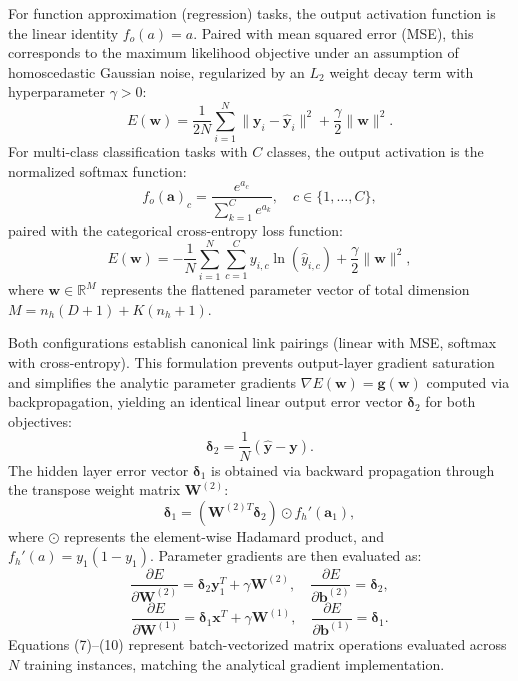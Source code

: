 \documentclass[10pt, conference]{IEEEtran}
\begin{document}
For function approximation (regression) tasks, the output activation function is the linear identity $f_o(a) = a$. Paired with mean squared error (MSE), this corresponds to the maximum likelihood objective under an assumption of homoscedastic Gaussian noise, regularized by an $L_2$ weight decay term with hyperparameter $\gamma > 0$:
\begin{equation}
E(\mathbf{w}) = \frac{1}{2N} \sum_{i=1}^N \|\mathbf{y}_i - \mathbf{\hat{y}}_i\|^2 + \frac{\gamma}{2} \|\mathbf{w}\|^2.
\end{equation}
For multi-class classification tasks with $C$ classes, the output activation is the normalized softmax function:
\begin{equation}
f_o(\mathbf{a})_c = \frac{e^{a_c}}{\sum_{k=1}^C e^{a_k}}, \quad c \in \{1, \dots, C\},
\end{equation}
paired with the categorical cross-entropy loss function:
\begin{equation}
E(\mathbf{w}) = -\frac{1}{N} \sum_{i=1}^N \sum_{c=1}^C y_{i,c} \ln(\hat{y}_{i,c}) + \frac{\gamma}{2} \|\mathbf{w}\|^2,
\end{equation}
where $\mathbf{w} \in \mathbb{R}^M$ represents the flattened parameter vector of total dimension $M = n_h(D + 1) + K(n_h + 1)$.

Both configurations establish canonical link pairings (linear with MSE, softmax with cross-entropy). This formulation prevents output-layer gradient saturation and simplifies the analytic parameter gradients $\nabla E(\mathbf{w}) = \mathbf{g}(\mathbf{w})$ computed via backpropagation, yielding an identical linear output error vector $\boldsymbol{\delta}_2$ for both objectives:
\begin{equation}
\boldsymbol{\delta}_2 = \frac{1}{N} (\mathbf{\hat{y}} - \mathbf{y}).
\end{equation}
The hidden layer error vector $\boldsymbol{\delta}_1$ is obtained via backward propagation through the transpose weight matrix $\mathbf{W}^{(2)}$:
\begin{equation}
\boldsymbol{\delta}_1 = (\mathbf{W}^{(2)T} \boldsymbol{\delta}_2) \odot f_h'(\mathbf{a}_1),
\end{equation}
where $\odot$ represents the element-wise Hadamard product, and $f_h'(a) = y_1(1 - y_1)$. Parameter gradients are then evaluated as:
\begin{equation}
\frac{\partial E}{\partial \mathbf{W}^{(2)}} = \boldsymbol{\delta}_2 \mathbf{y}_1^T + \gamma \mathbf{W}^{(2)}, \quad \frac{\partial E}{\partial \mathbf{b}^{(2)}} = \boldsymbol{\delta}_2,
\end{equation}
\begin{equation}
\frac{\partial E}{\partial \mathbf{W}^{(1)}} = \boldsymbol{\delta}_1 \mathbf{x}^T + \gamma \mathbf{W}^{(1)}, \quad \frac{\partial E}{\partial \mathbf{b}^{(1)}} = \boldsymbol{\delta}_1.
\end{equation}
Equations (7)--(10) represent batch-vectorized matrix operations evaluated across $N$ training instances, matching the analytical gradient implementation.
\end{document}
